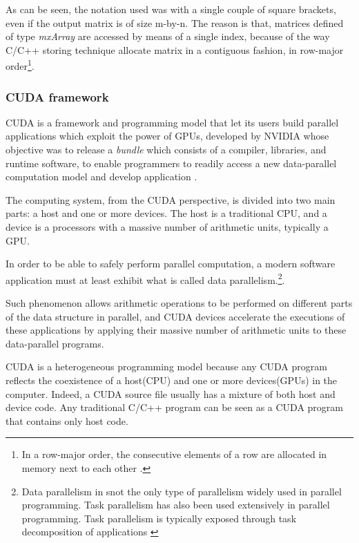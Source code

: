 \documentclass[12pt,a4paper]{extarticle}
\newcommand{\linespace}{\vspace{0pt}}
\begin{document}
As can be seen, the notation used was with a single couple of square brackets, even if the output matrix is of size m-by-n. The reason is that, matrices defined of type \textit{mxArray} are accessed by means of a single index, because of the way C/C++ storing technique allocate matrix in a contiguous fashion, in row-major order\footnote{In a row-major order, the consecutive elements of a row are allocated in memory next to each other \cite{wiki_row_major:1}. %
}.


\subsubsection{CUDA framework}
CUDA is a framework and programming model that let its users build parallel applications which exploit the power of GPUs, developed by NVIDIA whose objective was to release a \textit{bundle} which consists of a compiler, libraries, and runtime software, to enable programmers to readily access a new data-parallel computation model and develop application  \cite{KirkHwu_2014:3}.

The computing system, from the CUDA perspective, is divided into two main parts: a host and one or more devices. The host is a traditional CPU, and a device is a processors with a massive number of arithmetic units, typically a GPU.

In order to be able to safely perform parallel computation, a modern software application must at least exhibit what is called data parallelism.\footnote{Data parallelism in snot the only type of parallelism widely used in parallel programming. Task parallelism has also been used extensively in parallel programming. Task parallelism is typically exposed through task decomposition of applications  \cite{KirkHwu_2014:3}}.

Such phenomenon allows arithmetic operations to be performed on different parts of the data structure in parallel, and CUDA devices accelerate the executions of these applications by applying their massive number of arithmetic units to these data-parallel programs.
\linespace

CUDA is a heterogeneous programming model because any CUDA program reflects the coexistence of a host(CPU) and one or more devices(GPUs) in the computer. Indeed, a CUDA source file usually has a mixture of both host and device code.
Any traditional C/C++ program can be seen as a CUDA program that contains only host code.
\end{document}

